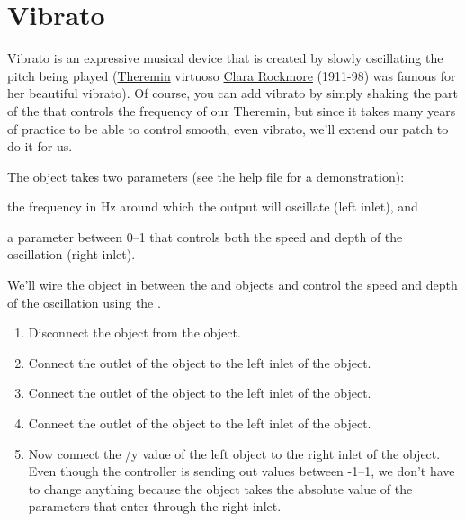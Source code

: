 \section{Vibrato}

Vibrato is an expressive musical device that is created by slowly oscillating the pitch 
being played (\href{http://en.wikipedia.org/wiki/Theremin}{Theremin} virtuoso 
\href{http://en.wikipedia.org/wiki/Clara_Rockmore}{Clara Rockmore} (1911-98) was famous for her beautiful vibrato).  
Of course, you can add vibrato by simply shaking the part of the \gt{} that controls 
the frequency of our Theremin, but since it takes many years of practice to be able to control smooth, 
even vibrato, we'll extend our patch to do it for us.

The  object takes two parameters (see the help file for a demonstration):  
\begin{inparaenum}[(1)]
  \item the frequency in Hz around which the output will oscillate (left inlet), and
  \item a parameter between 0--1 that controls both the speed and depth of 
the oscillation (right inlet).
\end{inparaenum}

We'll wire the  object in between the  and  objects and control the 
speed and depth of the oscillation using the \gt.

\begin{enumerate}
\item Disconnect the  object from the  object.
\item Connect the outlet of the  object to the left inlet of the  object.
\item Connect the outlet of the  object to the left inlet of the  object.
\item Connect the outlet of the  object to the left inlet of the \msp{*}{} object.
\item Now connect the /y value of the left  object to the right inlet of the  object.
Even though the controller is sending out values between -1--1, we don't have to change anything because
the  object takes the absolute value of the parameters that enter through the right inlet.


\end{enumerate}

